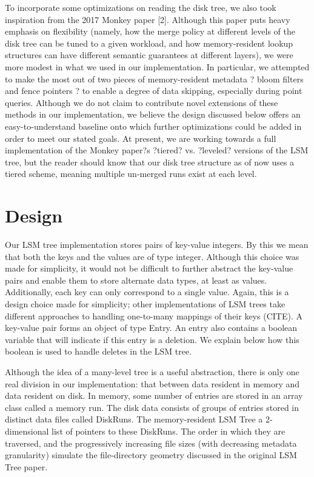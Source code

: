\documentclass[12pt]{article}
\begin{document}
	To incorporate some optimizations on reading the disk tree, we also took inspiration from the 2017 Monkey paper [2]. Although this paper puts heavy emphasis on flexibility (namely, how the merge policy at different levels of the disk tree can be tuned to a given workload, and how memory-resident lookup structures can have different semantic guarantees at different layers), we were more modest in what we used in our implementation. In particular, we attempted to make the most out of two pieces of memory-resident metadata ? bloom filters and fence pointers ? to enable a degree of data skipping, especially during point queries. Although we do not claim to contribute novel extensions of these methods in our implementation, we believe the design discussed below offers an easy-to-understand baseline onto which further optimizations could be added in order to meet our stated goals. At present, we are working towards a full implementation of the Monkey paper?s ?tiered? vs. ?leveled? versions of the LSM tree, but the reader should know that our disk tree structure as of now uses a tiered scheme, meaning multiple un-merged runs exist at each level.

\section{Design}
\indent \indent Our LSM tree implementation stores pairs of key-value integers. By this we mean that both the keys and the values are of type integer. Although this choice was made for simplicity, it would not be difficult to further abstract the key-value pairs and enable them to store alternate data types, at least as values. Additionally, each key can only correspond to a single value. Again, this is a design choice made for simplicity; other implementations of LSM trees take different approaches to handling one-to-many mappings of their keys (CITE). A key-value pair forms an object of type Entry. An entry also contains a boolean variable that will indicate if this entry is a deletion. We explain below how this boolean is used to handle deletes in the LSM tree.
	
	Although the idea of a many-level tree is a useful abstraction, there is only one real division in our implementation: that between data resident in memory and data resident on disk. In memory, some number of entries are stored in an array class called a memory run. The disk data consists of groups of entries stored in distinct data files called DiskRuns. The memory-resident LSM Tree a 2-dimensional list of pointers to these DiskRuns. The order in which they are traversed, and the progressively increasing file sizes (with decreasing metadata granularity) simulate the file-directory geometry discussed in the original LSM Tree paper.
	
\end{document}
